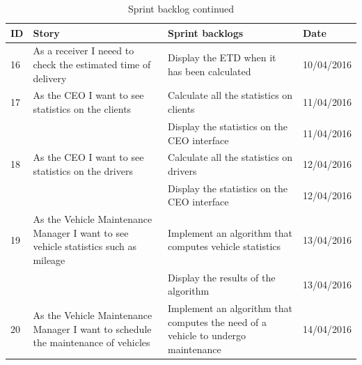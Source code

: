 \documentclass[paper=a4, fontsize=11pt]{scrartcl} %
\numberwithin{equation}{section} %
\numberwithin{figure}{section} %
\numberwithin{table}{section} %
\begin{document}
\begin{table}[!hbt]
\centering
\caption{Sprint backlog continued}
\label{my-label}
\begin{tabular}{|p{1cm}|p{5cm}|p{5cm}|p{2cm}|}
\hline
\textbf{ID} & \textbf{Story}                                                                                         & \textbf{Sprint backlogs}                                                          & \textbf{Date} \\ \hline
16          & As a receiver I neeed to check the estimated time of delivery                                          & Display the ETD when it has been calculated                                       & 10/04/2016    \\ \hline
17          & As the CEO I want to see statistics on the clients                                                     & Calculate all the statistics on clients                                           & 11/04/2016    \\ \hline
            &                                                                                                        & Display the statistics on the CEO interface                                       & 11/04/2016    \\ \hline
18          & As the CEO I want to see statistics on the drivers                                                     & Calculate all the statistics on drivers                                           & 12/04/2016    \\ \hline
            &                                                                                                        & Display the statistics on the CEO interface                                       & 12/04/2016    \\ \hline
19          & As the Vehicle Maintenance Manager I want to see vehicle statistics such as mileage                    & Implement an algorithm that computes vehicle statistics                           & 13/04/2016    \\ \hline
            &                                                                                                        & Display the results of the algorithm                                              & 13/04/2016    \\ \hline
20          & As the Vehicle Maintenance Manager I want to schedule the maintenance of vehicles                      & Implement an algorithm that computes the need of a vehicle to undergo maintenance & 14/04/2016    \\ \hline

\end{tabular}
\end{table}
\end{document}
